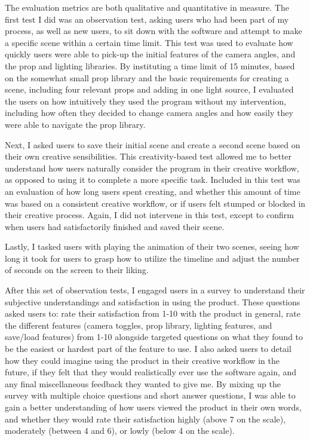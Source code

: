 \documentclass[10pt,twocolumn]{article}
\begin{document}
The evaluation metrics are both qualitative and quantitative in measure. The first test I did was an observation test, asking users who had been part of my process, as well as new users, to sit down with the software and attempt to make a specific scene within a certain time limit. This test was used to evaluate how quickly users were able to pick-up the initial features of the camera angles, and the prop and lighting libraries. By instituting a time limit of 15 minutes, based on the somewhat small prop library and the basic requirements for creating a scene, including four relevant props and adding in one light source, I evaluated the users on how intuitively they used the program without my intervention, including how often they decided to change camera angles and how easily they were able to navigate the prop library.

Next, I asked users to save their initial scene and create a second scene based on their own creative sensibilities. This creativity-based test allowed me to better understand how users naturally consider the program in their creative workflow, as opposed to using it to complete a more specific task. Included in this test was an evaluation of how long users spent creating, and whether this amount of time was based on a consistent creative workflow, or if users felt stumped or blocked in their creative process. Again, I did not intervene in this test, except to confirm when users had satisfactorily finished and saved their scene.

Lastly, I tasked users with playing the animation of their two scenes, seeing how long it took for users to grasp how to utilize the timeline and adjust the number of seconds on the screen to their liking. 

After this set of observation tests, I engaged users in a survey to understand their subjective understandings and satisfaction in using the product. These questions asked users to: rate their satisfaction from 1-10 with the product in general, rate the different features (camera toggles, prop library, lighting features, and save/load features) from 1-10 alongside targeted questions on what they found to be the easiest or hardest part of the feature to use. I also asked users to detail how they could imagine using the product in their creative workflow in the future, if they felt that they would realistically ever use the software again, and any final miscellaneous feedback they wanted to give me. By mixing up the survey with multiple choice questions and short answer questions, I was able to gain a better understanding of how users viewed the product in their own words, and whether they would rate their satisfaction highly (above 7 on the scale), moderately (between 4 and 6), or lowly (below 4 on the scale). 
\end{document}
